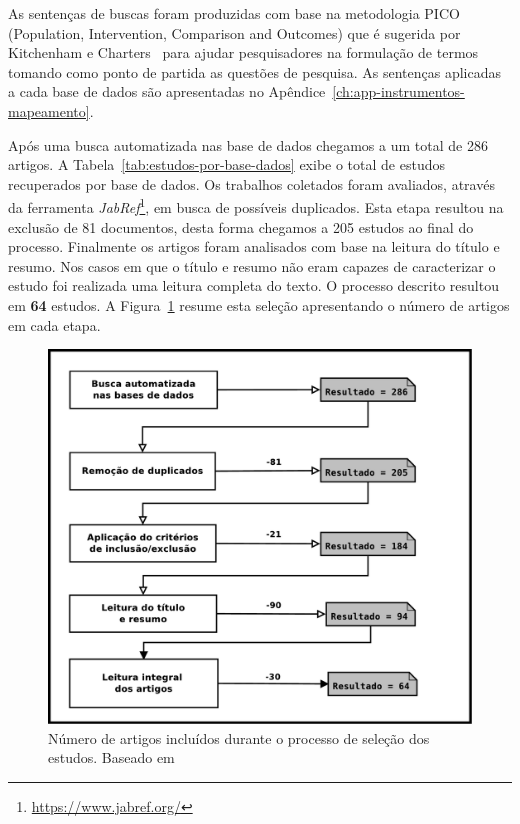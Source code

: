 As sentenças de buscas foram produzidas com base na metodologia PICO
(Population, Intervention, Comparison and Outcomes) que é sugerida por
Kitchenham e Charters~\cite{keele2007guidelines} para ajudar pesquisadores na
formulação de termos tomando como ponto de partida as questões de pesquisa. As
sentenças aplicadas a cada base de dados são apresentadas no
Apêndice~\ref{ch:app-instrumentos-mapeamento}.

Após uma busca automatizada nas base de dados chegamos a um total de 286
artigos. A Tabela~\ref{tab:estudos-por-base-dados} exibe o total de estudos
recuperados por base de dados.  Os trabalhos coletados foram avaliados, através
da ferramenta \textit{JabRef}\footnote{\url{https://www.jabref.org/}}, em busca
de possíveis duplicados. Esta etapa resultou na exclusão de 81 documentos, desta
forma chegamos a 205 estudos ao final do processo. Finalmente os artigos foram
analisados com base na leitura do título e resumo. Nos casos em que o título e
resumo não eram capazes de caracterizar o estudo foi realizada uma leitura
completa do texto. O processo descrito resultou em \textbf{64} estudos. A
Figura~\ref{fig:diagrama-processo-selecao} resume esta seleção apresentando o
número de artigos em cada etapa.

\begin{figure} \centering \includegraphics[width=0.75\linewidth]
	{./chapter-mapeamento-sistematico/img/diagrama-processo-selecao.pdf}
	\caption{Número de artigos incluídos durante o processo de seleção dos
		estudos. Baseado
		em~\cite{Petersen2015}}\label{fig:diagrama-processo-selecao}
\end{figure}


